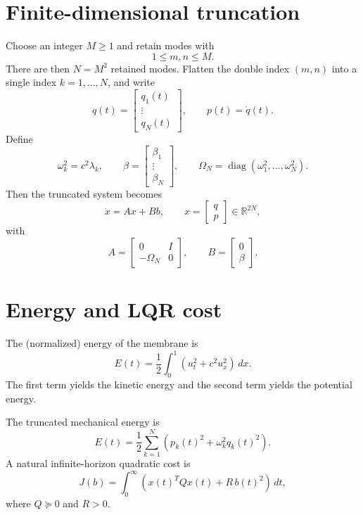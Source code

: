 \documentclass[11pt]{article}
\newcommand{\R}{\mathbb{R}}
\newcommand{\dd}{\,d}
\begin{document}
\section{Finite-dimensional truncation}
Choose an integer $M\ge 1$ and retain modes with
\[
1\le m,n\le M.
\]
There are then $N=M^2$ retained modes. Flatten the double index 
$(m,n)$ into a single index $k=1,\dots,N$, and write
\[
q(t)=\begin{bmatrix} q_1(t) \\ \vdots \\ q_N(t) \end{bmatrix},
\qquad
p(t)=\dot q(t).
\]
Define
\[
\omega_k^2=c^2\lambda_k,
\qquad
\beta=\begin{bmatrix}\beta_1 \\ \vdots \\ \beta_N\end{bmatrix},
\qquad
\Omega_N = \operatorname{diag}(\omega_1^2,\dots,\omega_N^2).
\]
Then the truncated system becomes
\begin{equation}
\label{eq:firstorder}
\dot x = A x + B b,
\qquad
x=\begin{bmatrix} q \\ p \end{bmatrix}\in\R^{2N},
\end{equation}
with
\begin{equation}
\label{eq:AB}
A=
\begin{bmatrix}
0 & I \\
-\Omega_N & 0
\end{bmatrix},
\qquad
B=
\begin{bmatrix}
0 \\
\beta
\end{bmatrix}.
\end{equation}

\section{Energy and LQR cost}
The (normalized) energy of the membrane is
\begin{equation}
E(t)=\frac12\int_{0}^{1}(u_t^2 + c^2 u_x^2)\,dx.
\end{equation}
The first term yields the kinetic energy and the second term
yields the potential energy.

The truncated mechanical energy is
\begin{equation}
\label{eq:energy}
E(t)=\frac12\sum_{k=1}^N \left(p_k(t)^2 + \omega_k^2 q_k(t)^2\right).
\end{equation}
A natural infinite-horizon quadratic cost is
\begin{equation}
\label{eq:cost}
J(b)=\int_0^{\infty} \left( x(t)^T Q x(t) + R\,b(t)^2 \right)\dd t,
\end{equation}
where $Q\succeq 0$ and $R>0$.
\end{document}
